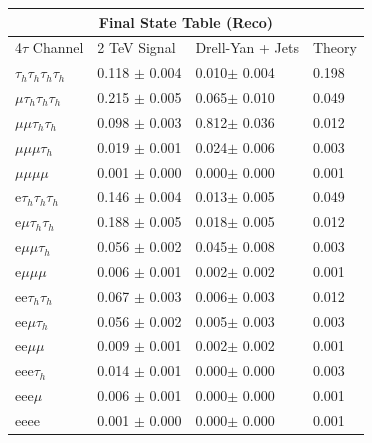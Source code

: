 \documentclass{article}
\begin{document}
 
\begin{landscape} 
\centering 
\begin{tabular}{|p{4.5cm}|p{3cm}|p{3cm}|p{3cm}|}\hline 
\multicolumn{4}{|c|}{Final State Table (Reco)} \\ 
\hline 
4$\tau$ Channel & 2 TeV Signal & Drell-Yan + Jets & Theory \\ 
\hline 
$\tau_h$$\tau_h$$\tau_h$$\tau_h$ & 0.118 $\pm$ 0.004 & 0.010$\pm$ 0.004 & 0.198\\
\hline 
$\mu$$\tau_h$$\tau_h$$\tau_h$ & 0.215 $\pm$ 0.005 & 0.065$\pm$ 0.010 & 0.049\\
\hline 
$\mu$$\mu$$\tau_h$$\tau_h$ & 0.098 $\pm$ 0.003 & 0.812$\pm$ 0.036 & 0.012\\
\hline 
$\mu$$\mu$$\mu$$\tau_h$ & 0.019 $\pm$ 0.001 & 0.024$\pm$ 0.006 & 0.003\\
\hline 
$\mu$$\mu$$\mu$$\mu$ & 0.001 $\pm$ 0.000 & 0.000$\pm$ 0.000 & 0.001\\
\hline 
e$\tau_h$$\tau_h$$\tau_h$ & 0.146 $\pm$ 0.004 & 0.013$\pm$ 0.005 & 0.049\\
\hline 
e$\mu$$\tau_h$$\tau_h$ & 0.188 $\pm$ 0.005 & 0.018$\pm$ 0.005 & 0.012\\
\hline 
e$\mu$$\mu$$\tau_h$ & 0.056 $\pm$ 0.002 & 0.045$\pm$ 0.008 & 0.003\\
\hline 
e$\mu$$\mu$$\mu$ & 0.006 $\pm$ 0.001 & 0.002$\pm$ 0.002 & 0.001\\
\hline 
ee$\tau_h$$\tau_h$ & 0.067 $\pm$ 0.003 & 0.006$\pm$ 0.003 & 0.012\\
\hline 
ee$\mu$$\tau_h$ & 0.056 $\pm$ 0.002 & 0.005$\pm$ 0.003 & 0.003\\
\hline 
ee$\mu$$\mu$ & 0.009 $\pm$ 0.001 & 0.002$\pm$ 0.002 & 0.001\\
\hline 
eee$\tau_h$ & 0.014 $\pm$ 0.001 & 0.000$\pm$ 0.000 & 0.003\\
\hline 
eee$\mu$ & 0.006 $\pm$ 0.001 & 0.000$\pm$ 0.000 & 0.001\\
\hline 
eeee & 0.001 $\pm$ 0.000 & 0.000$\pm$ 0.000 & 0.001\\
\hline 
\end{tabular} 
\end{landscape} 
\end{document}
